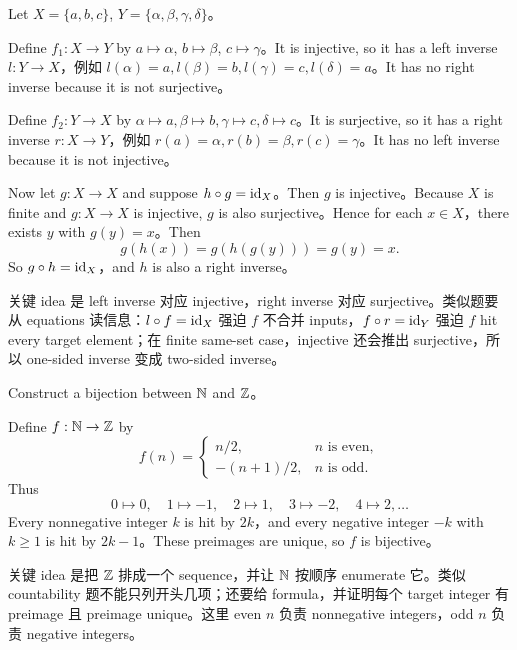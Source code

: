 \begin{solution}
Let \(X=\{a,b,c\}\), \(Y=\{\alpha,\beta,\gamma,\delta\}\)。

Define \(f_1:X\to Y\) by \(a\mapsto\alpha\), \(b\mapsto\beta\), \(c\mapsto\gamma\)。It is injective, so it has a left inverse \(l:Y\to X\)，例如 \(l(\alpha)=a,l(\beta)=b,l(\gamma)=c,l(\delta)=a\)。It has no right inverse because it is not surjective。

Define \(f_2:Y\to X\) by \(\alpha\mapsto a,\beta\mapsto b,\gamma\mapsto c,\delta\mapsto c\)。It is surjective, so it has a right inverse \(r:X\to Y\)，例如 \(r(a)=\alpha,r(b)=\beta,r(c)=\gamma\)。It has no left inverse because it is not injective。

Now let \(g:X\to X\) and suppose \(h\circ g=\mathrm{id}_X\)。Then \(g\) is injective。Because \(X\) is finite and \(g:X\to X\) is injective, \(g\) is also surjective。Hence for each \(x\in X\)，there exists \(y\) with \(g(y)=x\)。Then
\[
g(h(x))=g(h(g(y)))=g(y)=x.
\]
So \(g\circ h=\mathrm{id}_X\)，and \(h\) is also a right inverse。
\end{solution}

\begin{explanation}
关键 idea 是 left inverse 对应 injective，right inverse 对应 surjective。类似题要从 equations 读信息：\(l\circ f=\mathrm{id}_X\) 强迫 \(f\) 不合并 inputs，\(f\circ r=\mathrm{id}_Y\) 强迫 \(f\) hit every target element；在 finite same-set case，injective 还会推出 surjective，所以 one-sided inverse 变成 two-sided inverse。
\end{explanation}

\begin{exerciseblock}
Construct a bijection between \(\mathbb{N}\) and \(\mathbb{Z}\)。
\end{exerciseblock}

\begin{solution}
Define \(f:\mathbb{N}\to\mathbb{Z}\) by
\[
f(n)=
\begin{cases}
n/2,& n\text{ is even},\\
-(n+1)/2,& n\text{ is odd}.
\end{cases}
\]
Thus
\[
0\mapsto0,\quad 1\mapsto-1,\quad 2\mapsto1,\quad 3\mapsto-2,\quad 4\mapsto2,\ldots
\]
Every nonnegative integer \(k\) is hit by \(2k\)，and every negative integer \(-k\) with \(k\ge1\) is hit by \(2k-1\)。These preimages are unique, so \(f\) is bijective。
\end{solution}

\begin{explanation}
关键 idea 是把 \(\mathbb{Z}\) 排成一个 sequence，并让 \(\mathbb{N}\) 按顺序 enumerate 它。类似 countability 题不能只列开头几项；还要给 formula，并证明每个 target integer 有 preimage 且 preimage unique。这里 even \(n\) 负责 nonnegative integers，odd \(n\) 负责 negative integers。
\end{explanation}

